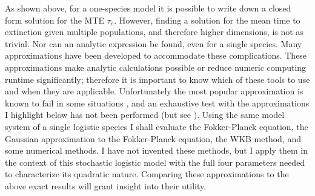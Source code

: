 As shown above, for a one-species model it is possible to write down a closed form solution for the MTE $\tau_e$.
However, finding a solution for the mean time to extinction given multiple populations, and therefore higher dimensions, is not as trivial. %
Nor can an analytic expression be found, even for a single species. 
Many approximations have been developed to accommodate these complications. 
These approximations make analytic calculations possible or reduce numeric computing runtime significantly; therefore it is important to know which of these tools to use and when they are applicable. 
Unfortunately the most popular approximation is known to fail in some situations \cite{Grasman1983,Doering2005}, and an exhaustive test with the approximations I highlight below has not been performed (but see \cite{Allen2003a,Yu2017}). 
Using the same model system of a single logistic species I shall evaluate the Fokker-Planck equation, the Gaussian approximation to the Fokker-Planck equation, the WKB method, and some numerical methods. %
I have not invented these methods, but I apply them in the context of this stochastic logistic model with the full four parameters needed to characterize its quadratic nature. 
Comparing these approximations to the above exact results will grant insight into their utility. %

